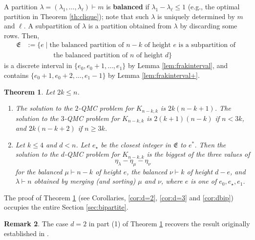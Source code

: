 \documentclass[12pt,dvipsnames,accepted=2016-08-18,a4paper,onecolumn]{quantumarticle}
\def\la{\lambda}
\def\la{\lambda}
\numberwithin{equation}{section}
\newtheorem{theorem}{Theorem}[section]
\theoremstyle{definition}
\newtheorem{remark}[theorem]{Remark}
\begin{document}
A partition $\lambda= (\lambda_1,\ldots,\lambda_\ell)\vdash m$ is \textbf{balanced} if $\lambda_1-\lambda_\ell\leq1$ (e.g., the optimal partition in Theorem \ref{th:clique}); note that such $\lambda$ is uniquely determined by $m$ and $\ell$. 
A subpartition of $\lambda$ is a partition obtained from $\lambda$ by discarding some rows. Then,
\[
\begin{split}
    \mathfrak E & :=\{e \mid \text{the balanced partition of $n-k$ of height $e$} \text{ is a subpartition of } \\
    &  \phantom{:=\{e \mid \ }
\text{ the balanced partition of $n$ of height $d$}     \}
\end{split}
\]
is a discrete interval in $\{e_0, e_0+1,\ldots,e_1\}$
by Lemma \ref{lem:frakinterval}, and contains
$\{e_0+1, e_0+2,\ldots,e_1-1\}$ by Lemma \ref{lem:frakinterval+}.

\begin{theorem}\label{th:bipintro}
Let $2k\le n$.
\begin{enumerate}[\rm (1)]
\item
The solution to the $2$-QMC problem for $K_{n-k,k}$ is
$2k(n-k+1)$. The solution to the $3$-QMC problem for $K_{n-k,k}$ is $2 ( k +1) (n-k)$ if $n<3k$, and $2k(n-k+2)$ if $n\ge3k$.

\item Let $k\le 4$ and $d<n$.
Let $e_\star$ be the closest integer in 
$\mathfrak E$ to $e^*$. Then the solution to the $d$-QMC problem for $K_{n-k,k}$ is the biggest of the three values of
\[\eta_\la-\eta_\mu-\eta_\nu\]
for the balanced $\mu\vdash n-k$ of height $e$, the balanced $\nu\vdash k$ of height $d-e$, and $\la\vdash n$ obtained by merging (and sorting) $\mu$ and $\nu$, where $e$ is one of $e_0,e_\star,e_1$.
\end{enumerate}
\end{theorem}

The proof of Theorem \ref{th:bipintro} (see Corollaries, \ref{cor:d=2}, \ref{cor:d=3} and \ref{cor:dbip}) occupies the entire 
Section \ref{sec:bipartite}. 

\begin{remark}
    The case $d=2$ in part (1) of Theorem \ref{th:bipintro} recovers the result originally established in \cite{LM62}.
\end{remark}
\end{document}
